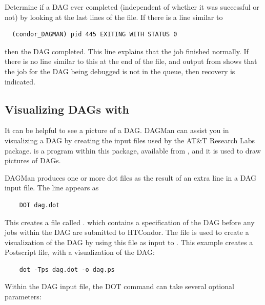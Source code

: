 Determine if a DAG ever completed 
(independent of whether it was successful or not) 
by looking at the last lines of the  file.
If there is a line similar to
\begin{verbatim}
  (condor_DAGMAN) pid 445 EXITING WITH STATUS 0
\end{verbatim}
then the DAG completed.
This line explains that the  job finished normally.
If there is no line similar to this at the end of the  file,
and output from  shows that the  job for
the DAG being debugged is not in the queue,
then recovery is indicated.

\subsection{Visualizing DAGs with }

It can be helpful to see a picture of a DAG.
DAGMan can assist you in visualizing a DAG by creating
the input files used by the AT\&T Research Labs 
 package. 
 is a program within this package,
available from ,
and it is used to draw pictures of DAGs. 

DAGMan produces one or more dot files as the result of
an extra line
in a DAG input file. 
The line appears as
\begin{verbatim}
    DOT dag.dot
\end{verbatim}

This creates a file called .
which contains
a specification of the DAG before any jobs within the DAG
are submitted to HTCondor.
The  file is used to create a visualization
of the DAG by using this file as input to .
This example creates a Postscript file, with a visualization of the DAG:

\begin{verbatim}
    dot -Tps dag.dot -o dag.ps
\end{verbatim}

Within the DAG input file,
the DOT command can take several optional parameters:

